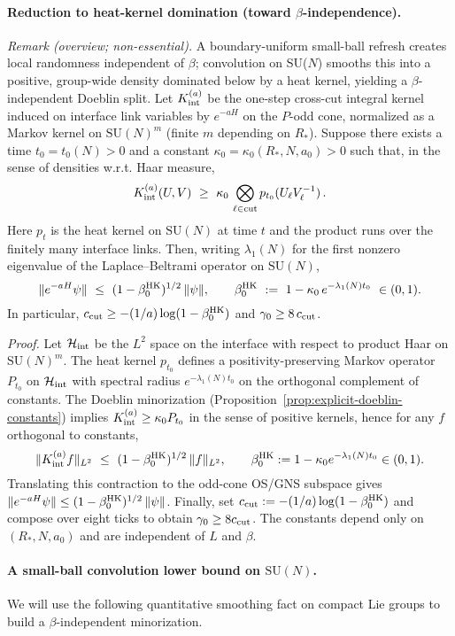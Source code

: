 \documentclass[11pt]{amsart}
\theoremstyle{plain}
\theoremstyle{definition}
\theoremstyle{remark}
\begin{document}
\paragraph{Reduction to heat-kernel domination (toward $\beta$-independence).} \emph{Remark (overview; non-essential).} A boundary-uniform small-ball refresh creates local randomness independent of $\beta$; convolution on SU($N$) smooths this into a positive, group-wide density dominated below by a heat kernel, yielding a $\beta$-independent Doeblin split.
Let $K_{\rm int}^{(a)}$ be the one-step cross-cut integral kernel induced on interface link variables by $e^{-aH}$ on the $P$-odd cone, normalized as a Markov kernel on $\mathrm{SU}(N)^m$ (finite $m$ depending on $R_*$). Suppose there exists a time $t_0=t_0(N)>0$ and a constant $\kappa_0=\kappa_0(R_*,N,a_0)>0$ such that, in the sense of densities w.r.t. Haar measure,
\[
  K_{\rm int}^{(a)}(U,V)\ \ge\ \kappa_0\,\bigotimes_{\ell\in \text{cut}} p_{t_0}(U_\ell V_\ell^{-1})\,.
\]
Here $p_{t}$ is the heat kernel on $\mathrm{SU}(N)$ at time $t$ and the product runs over the finitely many interface links. Then, writing $\lambda_1(N)$ for the first nonzero eigenvalue of the Laplace--Beltrami operator on $\mathrm{SU}(N)$,
\[
  \|e^{-aH}\psi\|\ \le\ (1-\beta_0^{\rm HK})^{1/2}\,\|\psi\|,\qquad
  \beta_0^{\rm HK}\ :=\ 1-\kappa_0\,e^{-\lambda_1(N) t_0}\ \in (0,1).
\]
In particular, $c_{\rm cut}\ge -(1/a)\log(1-\beta_0^{\rm HK})$ and $\gamma_0\ge 8\,c_{\rm cut}$.

\emph{Proof.} Let $\mathcal H_{\rm int}$ be the $L^2$ space on the interface with respect to product Haar on $\mathrm{SU}(N)^m$. The heat kernel $p_{t_0}$ defines a positivity-preserving Markov operator $P_{t_0}$ on $\mathcal H_{\rm int}$ with spectral radius $e^{-\lambda_1(N) t_0}$ on the orthogonal complement of constants. The Doeblin minorization (Proposition~\ref{prop:explicit-doeblin-constants}) implies $K_{\rm int}^{(a)} \ge \kappa_0 P_{t_0}$ in the sense of positive kernels, hence for any $f$ orthogonal to constants,
\[
  \|K_{\rm int}^{(a)} f\|_{L^2}\ \le\ (1-\beta_0^{\rm HK})^{1/2}\,\|f\|_{L^2},\qquad \beta_0^{\rm HK}:=1-\kappa_0 e^{-\lambda_1(N) t_0}\in(0,1).
\]
Translating this contraction to the odd-cone OS/GNS subspace gives $\|e^{-aH}\psi\|\le (1-\beta_0^{\rm HK})^{1/2}\,\|\psi\|$. Finally, set $c_{\rm cut}:=-(1/a)\log(1-\beta_0^{\rm HK})$ and compose over eight ticks to obtain $\gamma_0\ge 8 c_{\rm cut}$. The constants depend only on $(R_*,N,a_0)$ and are independent of $L$ and $\beta$.
\paragraph{A small-ball convolution lower bound on $\mathrm{SU}(N)$.}
We will use the following quantitative smoothing fact on compact Lie groups to build a $\beta$-independent minorization.
\end{document}
